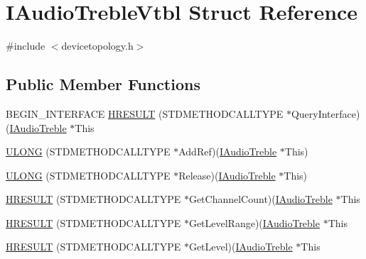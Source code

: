 \hypertarget{struct_i_audio_treble_vtbl}{}\section{I\+Audio\+Treble\+Vtbl Struct Reference}
\label{struct_i_audio_treble_vtbl}


{\ttfamily \#include $<$devicetopology.\+h$>$}

\subsection*{Public Member Functions}
\begin{DoxyCompactItemize}
\item 
B\+E\+G\+I\+N\+\_\+\+I\+N\+T\+E\+R\+F\+A\+CE \hyperlink{struct_i_audio_treble_vtbl_ab35767c1ea508dfe925d4fa4ab8863b0}{H\+R\+E\+S\+U\+LT} (S\+T\+D\+M\+E\+T\+H\+O\+D\+C\+A\+L\+L\+T\+Y\+PE $\ast$Query\+Interface)(\hyperlink{devicetopology_8h_a3ef1bf2f271f0005c3cb93c9d81d3f80}{I\+Audio\+Treble} $\ast$This
\item 
\hyperlink{struct_i_audio_treble_vtbl_aa977daef7e7d5b7b11338ad5318a0519}{U\+L\+O\+NG} (S\+T\+D\+M\+E\+T\+H\+O\+D\+C\+A\+L\+L\+T\+Y\+PE $\ast$Add\+Ref)(\hyperlink{devicetopology_8h_a3ef1bf2f271f0005c3cb93c9d81d3f80}{I\+Audio\+Treble} $\ast$This)
\item 
\hyperlink{struct_i_audio_treble_vtbl_a45c4fb2a3ed35aa723cd3ab22cc09c17}{U\+L\+O\+NG} (S\+T\+D\+M\+E\+T\+H\+O\+D\+C\+A\+L\+L\+T\+Y\+PE $\ast$Release)(\hyperlink{devicetopology_8h_a3ef1bf2f271f0005c3cb93c9d81d3f80}{I\+Audio\+Treble} $\ast$This)
\item 
\hyperlink{struct_i_audio_treble_vtbl_adc2817f22c46c9a1ebfaf94a10738d90}{H\+R\+E\+S\+U\+LT} (S\+T\+D\+M\+E\+T\+H\+O\+D\+C\+A\+L\+L\+T\+Y\+PE $\ast$Get\+Channel\+Count)(\hyperlink{devicetopology_8h_a3ef1bf2f271f0005c3cb93c9d81d3f80}{I\+Audio\+Treble} $\ast$This
\item 
\hyperlink{struct_i_audio_treble_vtbl_ace1940eec0b54ddc700bcac1fb56ec5f}{H\+R\+E\+S\+U\+LT} (S\+T\+D\+M\+E\+T\+H\+O\+D\+C\+A\+L\+L\+T\+Y\+PE $\ast$Get\+Level\+Range)(\hyperlink{devicetopology_8h_a3ef1bf2f271f0005c3cb93c9d81d3f80}{I\+Audio\+Treble} $\ast$This
\item 
\hyperlink{struct_i_audio_treble_vtbl_ada6f346cf4621c8b441a9d9ed299b6bc}{H\+R\+E\+S\+U\+LT} (S\+T\+D\+M\+E\+T\+H\+O\+D\+C\+A\+L\+L\+T\+Y\+PE $\ast$Get\+Level)(\hyperlink{devicetopology_8h_a3ef1bf2f271f0005c3cb93c9d81d3f80}{I\+Audio\+Treble} $\ast$This
\item 

\end{DoxyCompactItemize}
